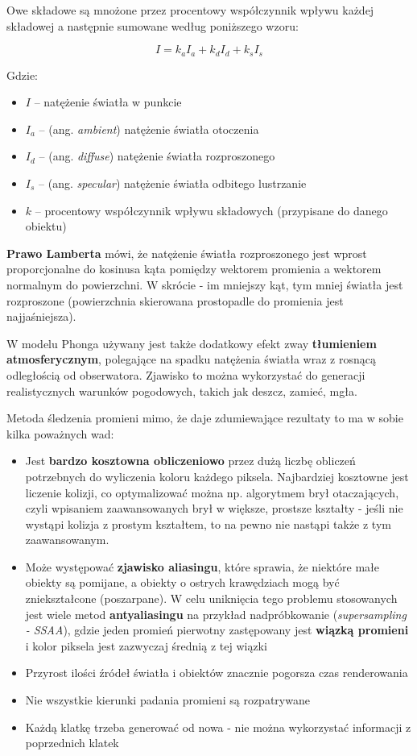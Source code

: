 Owe składowe są mnożone przez procentowy współczynnik wpływu każdej składowej a następnie sumowane według poniższego wzoru:

\begin{equation}
I = k_{a}I_{a} + k_{d}I_{d} + k_{s}I_{s}
\end{equation}

Gdzie:
\begin{itemize}
	\setlength\itemsep{1pt}
	\item $I$ – natężenie światła w punkcie
	\item $I_{a}$ – (ang. \textit{ambient}) natężenie światła otoczenia
	\item $I_{d}$ – (ang. \textit{diffuse}) natężenie światła rozproszonego
	\item $I_{s}$ – (ang. \textit{specular}) natężenie światła odbitego lustrzanie
	\item $k$ – procentowy współczynnik wpływu składowych (przypisane do danego obiektu)
\end{itemize}

\textbf{Prawo Lamberta} mówi, że natężenie światła rozproszonego jest wprost proporcjonalne do kosinusa kąta pomiędzy wektorem promienia a wektorem normalnym do powierzchni. W skrócie - im mniejszy kąt, tym mniej światła jest rozproszone (powierzchnia skierowana prostopadle do promienia jest najjaśniejsza).

W modelu Phonga używany jest także dodatkowy efekt zway \textbf{tłumieniem atmosferycznym}, polegające na spadku natężenia światła wraz z rosnącą odległością od obserwatora. Zjawisko to można wykorzystać do generacji realistycznych warunków pogodowych, takich jak deszcz, zamieć, mgła.

Metoda śledzenia promieni mimo, że daje zdumiewające rezultaty to ma w sobie kilka poważnych wad:
\begin{itemize}
	\setlength\itemsep{1pt}
	\item Jest \textbf{bardzo kosztowna obliczeniowo} przez dużą liczbę obliczeń potrzebnych do wyliczenia koloru każdego piksela. Najbardziej kosztowne jest liczenie kolizji, co optymalizować można np. algorytmem brył otaczających, czyli wpisaniem zaawansowanych brył w większe, prostsze kształty - jeśli nie wystąpi kolizja z prostym kształtem, to na pewno nie nastąpi także z tym zaawansowanym.
	\item Może występować \textbf{zjawisko aliasingu}, które sprawia, że niektóre małe obiekty są pomijane, a obiekty o ostrych krawędziach mogą być zniekształcone (poszarpane). W celu uniknięcia tego problemu stosowanych jest wiele metod \textbf{antyaliasingu} na przykład nadpróbkowanie (\textit{supersampling - SSAA}), gdzie jeden promień pierwotny zastępowany jest \textbf{wiązką promieni} i kolor piksela jest zazwyczaj średnią z tej wiązki
	\item Przyrost ilości źródeł światła i obiektów znacznie pogorsza czas renderowania
	\item Nie wszystkie kierunki padania promieni są rozpatrywane
	\item Każdą klatkę trzeba generować od nowa - nie można wykorzystać informacji z poprzednich klatek
\end{itemize}

